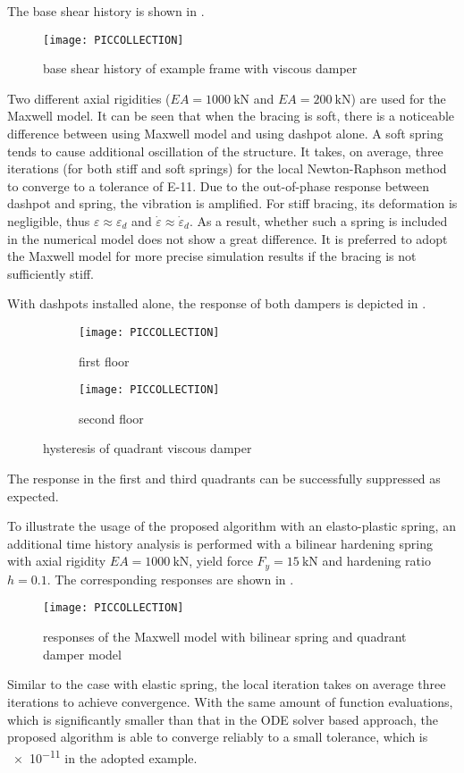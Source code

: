 The base shear history is shown in .
\begin{figure}[ht]
\centering\scriptsize
\texttt{[image: PICCOLLECTION]}
\caption{base shear history of example frame with viscous damper}\label{fig:frame_shear_history}
\end{figure}
Two different axial rigidities ($EA=\SI{1000}{\kilo\newton}$ and $EA=\SI{200}{\kilo\newton}$) are used for the Maxwell model. It can be seen that when the bracing is soft, there is a noticeable difference between using Maxwell model and using dashpot alone. A soft spring tends to cause additional oscillation of the structure. It takes, on average, three iterations (for both stiff and soft springs) for the local Newton-Raphson method to converge to a tolerance of \num[print-unity-mantissa=false]{E-11}. Due to the out-of-phase response between dashpot and spring, the vibration is amplified. For stiff bracing, its deformation is negligible, thus $\varepsilon\approx\varepsilon_d$ and $\dot\varepsilon\approx\dot\varepsilon_d$. As a result, whether such a spring is included in the numerical model does not show a great difference. It is preferred to adopt the Maxwell model for more precise simulation results if the bracing is not sufficiently stiff.

With dashpots installed alone, the response of both dampers is depicted in .
\begin{figure}[ht]
\centering\scriptsize
\begin{subfigure}{.49\textwidth}\centering
\texttt{[image: PICCOLLECTION]}
\caption{first floor}
\end{subfigure}\hfill
\begin{subfigure}{.49\textwidth}\centering
\texttt{[image: PICCOLLECTION]}
\caption{second floor}
\end{subfigure}
\caption{hysteresis of quadrant viscous damper}\label{fig:frame_damper}
\end{figure}
The response in the first and third quadrants can be successfully suppressed as expected.

To illustrate the usage of the proposed algorithm with an elasto-plastic spring, an additional time history analysis is performed with a bilinear hardening spring with axial rigidity $EA=\SI{1000}{\kilo\newton}$, yield force $F_y=\SI{15}{\kilo\newton}$ and hardening ratio $h=0.1$. The corresponding responses are shown in .
\begin{figure}[ht]
\centering\scriptsize
\texttt{[image: PICCOLLECTION]}
\caption{responses of the Maxwell model with bilinear spring and quadrant damper model}\label{fig:frame_maxwell_bilinear}
\end{figure}
Similar to the case with elastic spring, the local iteration takes on average three iterations to achieve convergence. With the same amount of function evaluations, which is significantly smaller than that in the ODE solver based approach, the proposed algorithm is able to converge reliably to a small tolerance, which is \num[print-unity-mantissa=false]{e-11} in the adopted example.
